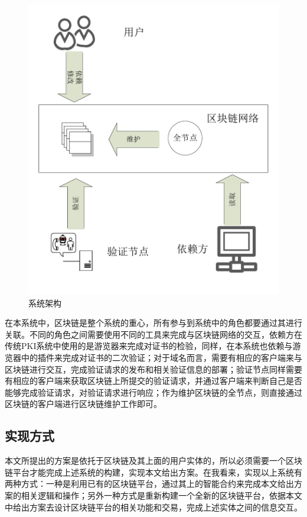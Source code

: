 \begin{figure}[htbp]
 	\centering
 	\includegraphics[scale=0.6]{img/system_framework}
 	\caption{系统架构}\label{fig:framework}
\end{figure}



在本系统中，区块链是整个系统的重心，所有参与到系统中的角色都要通过其进行关联。不同的角色之间需要使用不同的工具来完成与区块链网络的交互，依赖方在传统PKI系统中使用的是游览器来完成对证书的检验，同样，在本系统也依赖与游览器中的插件来完成对证书的二次验证；对于域名而言，需要有相应的客户端来与区块链进行交互，完成验证请求的发布和相关验证信息的部署；验证节点同样需要有相应的客户端来获取区块链上所提交的验证请求，并通过客户端来判断自己是否能够完成验证请求，对验证请求进行响应；作为维护区块链的全节点，则直接通过区块链的客户端进行区块链维护工作即可。

\subsection{实现方式}

本文所提出的方案是依托于区块链及其上面的用户实体的，所以必须需要一个区块链平台才能完成上述系统的构建，实现本文给出方案。在我看来，实现以上系统有两种方式：一种是利用已有的区块链平台，通过其上的智能合约来完成本文给出方案的相关逻辑和操作；另外一种方式是重新构建一个全新的区块链平台，依据本文中给出方案去设计区块链平台的相关功能和交易，完成上述实体之间的信息交互。

